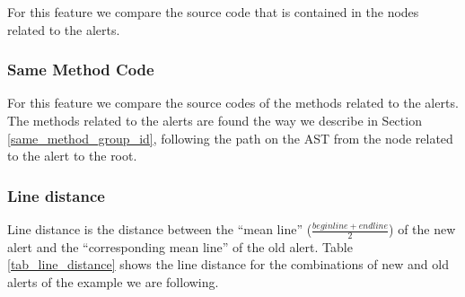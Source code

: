 \documentclass[
]{article}
\begin{document}
For this feature we compare the source code that is contained in the
nodes related to the alerts.

\subsubsection {Same Method Code}

For this feature we compare the source codes of the methods related to
the alerts. The methods related to the alerts are found the way we
describe in Section \ref{same_method_group_id}, following the path on
the AST from the node related to the alert to the root.

\subsubsection {Line distance}\label{line_distance}

Line distance is the distance between the ``mean line''
(\(\frac{beginline + endline}{2}\)) of the new alert and the
``corresponding mean line'' of the old alert. Table
\ref{tab_line_distance} shows the line distance for the combinations of
new and old alerts of the example we are following.

\small

\begin{table}[H]

\caption{\label{tab:unnamed-chunk-12}Line distance feature \label{tab_line_distance}}
\centering
{}
\end{table}
\end{document}
